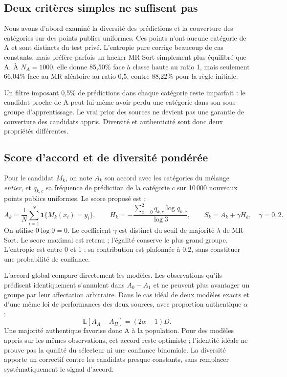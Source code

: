 \documentclass[11pt,a4paper]{article}
\newcommand{\ind}{\mathbf{1}}
\newcommand{\E}{\mathbb{E}}
\begin{document}
\subsection{Deux critères simples ne suffisent pas}

Nous avons d'abord examiné la diversité des prédictions et la couverture des
catégories sur des points publics uniformes. Ces points n'ont aucune catégorie
de A et sont distincts du test privé. L'entropie pure corrige beaucoup de cas
constants, mais préfère parfois un hacker MR-Sort simplement plus équilibré
que A. À $N_A=1000$, elle donne 85,50\% face à classe haute au ratio 1, mais
seulement 66,04\% face au MR aléatoire au ratio 0,5, contre 88,22\% pour la
règle initiale.

Un filtre imposant 0,5\% de prédictions dans chaque catégorie reste imparfait :
le candidat proche de A peut lui-même avoir perdu une catégorie dans son
sous-groupe d'apprentissage. Le vrai prior des sources ne devient pas une
garantie de couverture des candidats appris. Diversité et authenticité sont
donc deux propriétés différentes.

\subsection{Score d'accord et de diversité pondérée}

Pour le candidat $M_k$, on note $A_k$ son accord avec les catégories du mélange
\emph{entier}, et $q_{k,c}$ sa fréquence de prédiction de la catégorie $c$ sur
10\,000 nouveaux points publics uniformes. Le score proposé est :
\begin{equation}
 A_k=\frac1N\sum_{i=1}^{N}\ind\{M_k(x_i)=y_i\},\qquad
 H_k=-\frac{\sum_{c=0}^{2}q_{k,c}\log q_{k,c}}{\log3},\qquad
 S_k=A_k+\gamma H_k,\quad\gamma=0,2.
 \label{eq:hybride}
\end{equation}
On utilise $0\log0=0$. Le coefficient $\gamma$ est distinct du seuil de majorité
$\lambda$ de MR-Sort. Le score maximal est retenu ; l'égalité conserve le plus
grand groupe. L'entropie est entre 0 et 1 : sa contribution est plafonnée à
0,2, sans constituer une probabilité de confiance.

L'accord global compare directement les modèles. Les observations qu'ils
prédisent identiquement s'annulent dans $A_0-A_1$ et ne peuvent plus avantager
un groupe par leur affectation arbitraire. Dans le cas idéal de deux modèles
exacts et d'une même loi de performances des deux sources, avec proportion
authentique $\alpha$ :
\begin{equation}
 \E[A_A-A_H]=(2\alpha-1)D.
 \label{eq:vote}
\end{equation}
Une majorité authentique favorise donc A à la population. Pour des modèles
appris sur les mêmes observations, cet accord reste optimiste ; l'identité
idéale ne prouve pas la qualité du sélecteur ni une confiance binomiale.
La diversité apporte un correctif contre les candidats presque constants,
sans remplacer systématiquement le signal d'accord.
\end{document}
